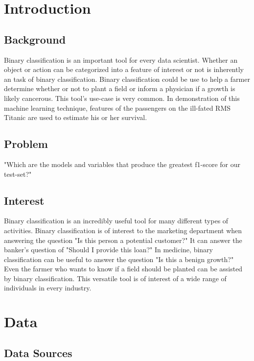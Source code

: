 \documentclass[10pt]{article}
\begin{document}
\begin{multicols}{2}
\section{Introduction}
\subsection{Background}
	
	Binary classification is an important tool for every data scientist.
	Whether an object or action can be categorized into a feature of interest or not is inherently an task of binary classification.
	Binary classification could be use to help a farmer determine whether or not to plant a field or inform a physician if a growth is likely cancerous.
	This tool's use-case is very common.
	In demonstration of this machine learning technique, features of the passengers on the ill-fated RMS Titanic are used to estimate his or her survival.
	
\subsection{Problem}	
	
	"Which are the models and variables that produce the greatest f1-score for our test-set?"

\subsection{Interest}
	
	Binary classification is an incredibly useful tool for many different types of activities.
	Binary classification is of interest to the marketing department when answering the question "Is this person a potential customer?"
	It can answer the banker's question of "Should I provide this loan?"
	In medicine, binary classification can be useful to answer the question "Is this a benign growth?"
	Even the farmer who wants to know if a field should be planted can be assisted by binary classification.
	This versatile tool is of interest of a wide range of individuals in every industry.
\section{Data} \label{documentclasses}
\subsection{Data Sources}


\end{multicols}
\end{document}

